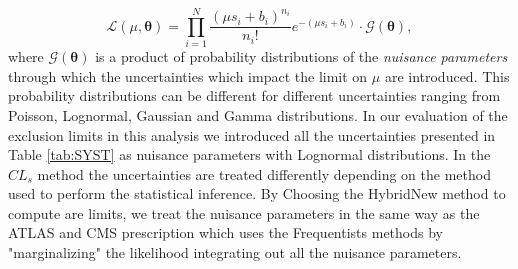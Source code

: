 \begin{equation}\label{eq:LL}
\mathcal{L}\left( \mu, \mathbf{\theta} \right) = \prod^{N}_{i=1} \frac{{\left( \mu s_{i} + b_{i} \right)}^{n_{i}}}{n_{i}!} e^{-(\mu s_{i} + b_{i})} \cdot \mathcal{G}(\mathbf{\theta} ),
\end{equation}
where $\mathcal{G}(\mathbf{\theta})$ is a product of probability distributions of the \textit{nuisance parameters} through which the uncertainties which impact the limit on $\mu$ are introduced. This probability distributions can be different for different uncertainties ranging from Poisson, Lognormal, Gaussian and Gamma distributions. In our evaluation of the exclusion limits in this analysis we introduced all the uncertainties presented in Table \ref{tab:SYST} as nuisance parameters with Lognormal distributions.
In the $CL_{s}$ method the uncertainties are treated differently depending on the method used to perform the statistical inference. By Choosing the HybridNew method to compute are limits, we treat the nuisance parameters in the same way as the ATLAS and CMS prescription which uses the Frequentists methods by "marginalizing" the likelihood \ie integrating out all the nuisance parameters. 
